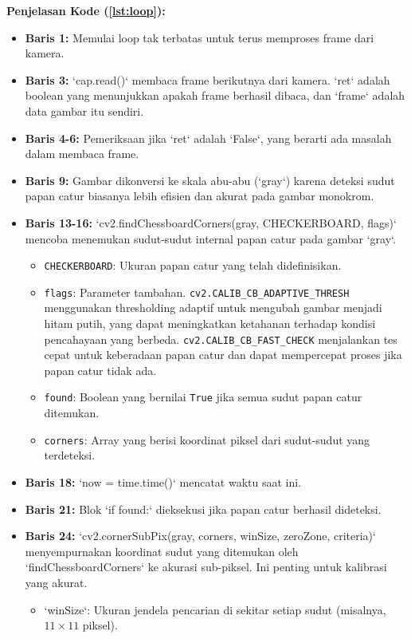 \documentclass[12pt,a4paper]{article}
\begin{document}
\textbf{Penjelasan Kode (\ref{lst:loop}):}
\begin{itemize}
    \item \textbf{Baris 1:} Memulai loop tak terbatas untuk terus memproses frame dari kamera.
    \item \textbf{Baris 3:} `cap.read()` membaca frame berikutnya dari kamera. `ret` adalah boolean yang menunjukkan apakah frame berhasil dibaca, dan `frame` adalah data gambar itu sendiri.
    \item \textbf{Baris 4-6:} Pemeriksaan jika `ret` adalah `False`, yang berarti ada masalah dalam membaca frame.
    \item \textbf{Baris 9:} Gambar dikonversi ke skala abu-abu (`gray`) karena deteksi sudut papan catur biasanya lebih efisien dan akurat pada gambar monokrom.
    \item \textbf{Baris 13-16:} `cv2.findChessboardCorners(gray, CHECKERBOARD, flags)` mencoba menemukan sudut-sudut internal papan catur pada gambar `gray`.
          \begin{itemize}
              \item \texttt{CHECKERBOARD}: Ukuran papan catur yang telah didefinisikan.
              \item \texttt{flags}: Parameter tambahan. \texttt{cv2.CALIB\_CB\_ADAPTIVE\_THRESH} menggunakan thresholding adaptif untuk mengubah gambar menjadi hitam putih, yang dapat meningkatkan ketahanan terhadap kondisi pencahayaan yang berbeda. \texttt{cv2.CALIB\_CB\_FAST\_CHECK} menjalankan tes cepat untuk keberadaan papan catur dan dapat mempercepat proses jika papan catur tidak ada.
              \item \texttt{found}: Boolean yang bernilai \texttt{True} jika semua sudut papan catur ditemukan.
              \item \texttt{corners}: Array yang berisi koordinat piksel dari sudut-sudut yang terdeteksi.
          \end{itemize}
    \item \textbf{Baris 18:} `now = time.time()` mencatat waktu saat ini.
    \item \textbf{Baris 21:} Blok `if found:` dieksekusi jika papan catur berhasil dideteksi.
    \item \textbf{Baris 24:} `cv2.cornerSubPix(gray, corners, winSize, zeroZone, criteria)` menyempurnakan koordinat sudut yang ditemukan oleh `findChessboardCorners` ke akurasi sub-piksel. Ini penting untuk kalibrasi yang akurat.
          \begin{itemize}
              \item `winSize`: Ukuran jendela pencarian di sekitar setiap sudut (misalnya, $11 \times 11$ piksel).

\end{itemize}
\end{itemize}
\end{document}
